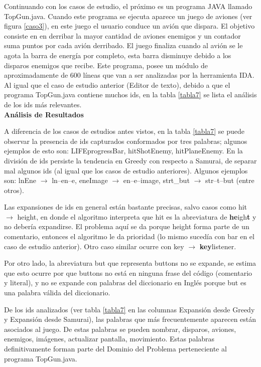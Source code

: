 Continuando con los casos de estudio, el próximo es un programa JAVA llamado TopGun.java. Cuando este programa se ejecuta aparece un juego de aviones (ver figura \ref{caso3}), en este juego el usuario conduce un avión que dispara. El objetivo consiste en en derribar la mayor cantidad de aviones enemigos y un contador suma puntos por cada avión derribado. El juego finaliza cuando al avión se le agota la barra de energía por completo, esta barra disminuye debido a los disparos enemigos que recibe.
Este programa, posee un módulo de aproximadamente de 600 líneas que van a ser analizadas por la herramienta IDA.
Al igual que el caso de estudio anterior (Editor de texto), debido a que el programa TopGun.java contiene muchos ids, en la tabla \ref{tabla7} se lista el análisis de los ids más relevantes.\\

\noindent \textbf{Análisis de Resultados\\}

A diferencia de los casos de estudios antes vistos, en la tabla \ref{tabla7} se puede observar la presencia de ids capturados conformados por tres palabras; algunos ejemplos de esto son: \textsf{LIFEprogressBar}, \textsf{hitShotEnemy}, \textsf{hitPlaneEnemy}.
En la división de ids persiste la tendencia en Greedy con respecto a Samurai, de separar mal algunos ids (al igual que los casos de estudio anteriores). Algunos ejemplos son: \textsf{lnEne} $\rightarrow$ \textsf{ln--en--e}, \textsf{eneImage}  $\rightarrow$ \textsf{en--e--image}, \textsf{strt\_but} $\rightarrow$ \textsf{str--t--but} (entre otros).

Las expansiones de ids en general están bastante precisas, salvo casos como \textsf{hit} $\rightarrow$ \textsf{height}, en donde el algoritmo interpreta que \textsf{hit} es la abreviatura de \textsf{\textbf{he}igh\textbf{t}} y no debería expandirse. El problema aquí se da porque \textsf{height} forma parte de un comentario, entonces el algoritmo le da prioridad (lo mismo sucedía con \textsf{bar} en el caso de estudio anterior). Otro caso similar ocurre con \textsf{key} $\rightarrow$ \textsf{\textbf{key}listener}.

Por otro lado, la abreviatura \textsf{but} que representa \textsf{buttons} no se expande, se estima que esto ocurre por que \textsf{buttons} no está en ninguna frase del código (comentario y literal), y no se expande con palabras del diccionario en Inglés porque \textsf{but} es una palabra válida del diccionario.

De los ids analizados (ver tabla \ref{tabla7} en las columnas Expansión desde Greedy y Expansión desde Samurai), las palabras que más frecuentemente aparecen están asociados al juego. De estas palabras se pueden nombrar, disparos, aviones, enemigos, imágenes, actualizar pantalla, movimiento. Estas palabras definitivamente forman parte del Dominio del Problema perteneciente al programa TopGun.java.

